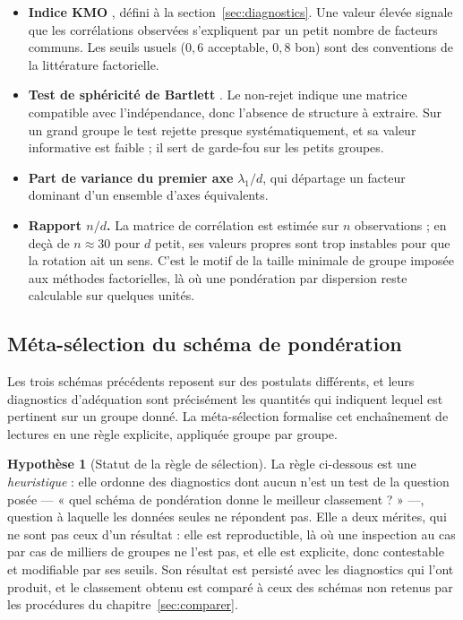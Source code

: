 \documentclass[11pt,a4paper]{article}
\theoremstyle{definition}
\newtheorem{hypothese}{Hypothèse}[section]
\theoremstyle{remark}
\begin{document}
\begin{itemize}[nosep,leftmargin=1.6em]
  \item \textbf{Indice KMO} \citep{kaiser1974}, défini à la
  section~\ref{sec:diagnostics}. Une valeur élevée signale que les corrélations observées
  s'expliquent par un petit nombre de facteurs communs. Les seuils usuels
  ($0{,}6$ acceptable, $0{,}8$ bon) sont des conventions de la littérature factorielle.
  \item \textbf{Test de sphéricité de Bartlett} \citep{bartlett1951}. Le non-rejet
  indique une matrice compatible avec l'indépendance, donc l'absence de structure à
  extraire. Sur un grand groupe le test rejette presque systématiquement, et sa valeur
  informative est faible ; il sert de garde-fou sur les petits groupes.
  \item \textbf{Part de variance du premier axe} $\lambda_1/d$, qui départage un facteur
  dominant d'un ensemble d'axes équivalents.
  \item \textbf{Rapport $n/d$.} La matrice de corrélation est estimée sur $n$
  observations ; en deçà de $n \approx 30$ pour $d$ petit, ses valeurs propres sont trop
  instables pour que la rotation ait un sens. C'est le motif de la taille minimale de
  groupe imposée aux méthodes factorielles, là où une pondération par dispersion reste
  calculable sur quelques unités.
\end{itemize}

\bigskip

\subsection{Méta-sélection du schéma de pondération}
\label{sec:meta}

\medskip

Les trois schémas précédents reposent sur des postulats différents, et leurs diagnostics
d'adéquation sont précisément les quantités qui indiquent lequel est pertinent sur un
groupe donné. La méta-sélection formalise cet enchaînement de lectures en une règle
explicite, appliquée groupe par groupe.

\medskip

\begin{hypothese}[Statut de la règle de sélection]
  \label{hyp:meta}
  La règle ci-dessous est une \emph{heuristique} : elle ordonne des diagnostics dont
  aucun n'est un test de la question posée --- « quel schéma de pondération donne le
  meilleur classement ? » ---, question à laquelle les données seules ne répondent pas.
  Elle a deux mérites, qui ne sont pas ceux d'un résultat : elle est reproductible, là où
  une inspection au cas par cas de milliers de groupes ne l'est pas, et elle est
  explicite, donc contestable et modifiable par ses seuils. Son résultat est persisté avec
  les diagnostics qui l'ont produit, et le classement obtenu est comparé à ceux des
  schémas non retenus par les procédures du chapitre~\ref{sec:comparer}.
\end{hypothese}
\end{document}
